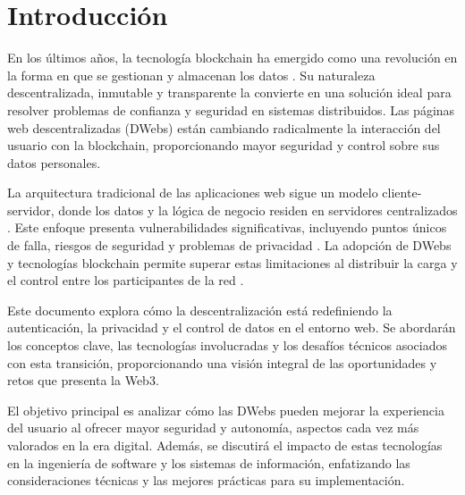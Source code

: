 \section{Introducción}

En los últimos años, la tecnología blockchain ha emergido como una revolución en la forma en que se gestionan y almacenan los datos \cite{nakamoto2008bitcoin}. Su naturaleza descentralizada, inmutable y transparente la convierte en una solución ideal para resolver problemas de confianza y seguridad en sistemas distribuidos. Las páginas web descentralizadas (DWebs) están cambiando radicalmente la interacción del usuario con la blockchain, proporcionando mayor seguridad y control sobre sus datos personales.

La arquitectura tradicional de las aplicaciones web sigue un modelo cliente-servidor, donde los datos y la lógica de negocio residen en servidores centralizados \cite{fielding2000architectural}. Este enfoque presenta vulnerabilidades significativas, incluyendo puntos únicos de falla, riesgos de seguridad y problemas de privacidad \cite{singh2004survey}. La adopción de DWebs y tecnologías blockchain permite superar estas limitaciones al distribuir la carga y el control entre los participantes de la red \cite{zheng2018blockchain}.

Este documento explora cómo la descentralización está redefiniendo la autenticación, la privacidad y el control de datos en el entorno web. Se abordarán los conceptos clave, las tecnologías involucradas y los desafíos técnicos asociados con esta transición, proporcionando una visión integral de las oportunidades y retos que presenta la Web3.

El objetivo principal es analizar cómo las DWebs pueden mejorar la experiencia del usuario al ofrecer mayor seguridad y autonomía, aspectos cada vez más valorados en la era digital. Además, se discutirá el impacto de estas tecnologías en la ingeniería de software y los sistemas de información, enfatizando las consideraciones técnicas y las mejores prácticas para su implementación.


